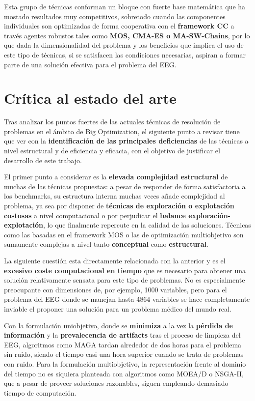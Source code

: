 Esta grupo de técnicas conforman un bloque con fuerte base matemática que ha mostado resultados muy competitivos, sobretodo cuando las componentes individuales son optimizadas de forma cooperativa con el \textbf{framework CC} a través agentes robustos tales como \textbf{MOS, CMA-ES o MA-SW-Chains}, por lo que dada la dimensionalidad del problema y los beneficios que implica el uso de este tipo de técnicas, si se satisfacen las condiciones necesarias, aspiran a formar parte de una solución efectiva para el problema del EEG.


\section{Crítica al estado del arte}

Tras analizar los puntos fuertes de las actuales técnicas de resolución de problemas en el ámbito de Big Optimization, el siguiente punto a revisar tiene que ver con la \textbf{identificación de las principales deficiencias} de las técnicas a nivel estructural y de eficiencia y eficacia, con el objetivo de justificar el desarrollo de este trabajo.

El primer punto a considerar es la \textbf{elevada complejidad estructural} de muchas de las técnicas propuestas: a pesar de responder de forma satisfactoria a los benchmarks, su estructura interna muchas veces añade complejidad al problema, ya sea por disponer de \textbf{técnicas de exploración o explotación costosas} a nivel computacional o por perjudicar el \textbf{balance exploración-explotación}, lo que finalmente repercute en la calidad de las soluciones. Técnicas como las basadas en el framework MOS o las de optimización multiobjetivo son sumamente complejas a nivel tanto \textbf{conceptual} como \textbf{estructural}.

La siguiente cuestión esta directamente relacionada con la anterior y es el \textbf{excesivo coste computacional en tiempo} que es necesario para obtener una solución relativamente sensata para este tipo de problemas. No es especialmente preocupante con dimensiones de, por ejemplo, 1000 variables, pero para el problema del EEG donde se manejan hasta 4864 variables se hace completamente inviable el proponer una solución para un problema médico del mundo real. 

Con la formulación uniobjetivo, donde se \textbf{minimiza} a la vez la \textbf{pérdida de información} y la \textbf{prevalecencia de artifacts} tras el proceso de limpieza del EEG, algoritmos como MAGA tardan alrededor de dos horas para el problema sin ruido, siendo el tiempo casi una hora superior cuando se trata de problemas con ruido. Para la formulación multiobjetivo, la representación frente al dominio del tiempo no es siquiera planteada con algoritmos como MOEA/D o NSGA-II, que a pesar de proveer soluciones razonables, siguen empleando demasiado tiempo de computación.

